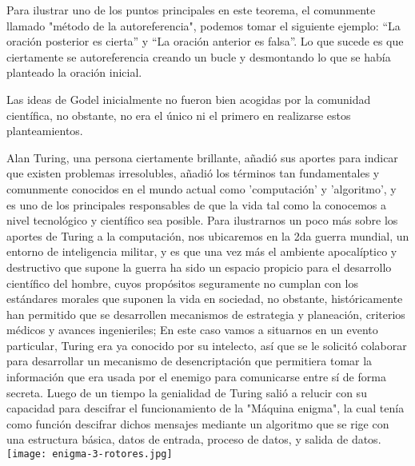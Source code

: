 \documentclass{article}
\begin{document}
Para ilustrar uno de los puntos principales en este teorema, el comunmente llamado "método de la autoreferencia", podemos tomar el siguiente ejemplo: “La oración posterior es cierta” y “La oración anterior es falsa”. Lo que sucede es que ciertamente se autoreferencia creando un bucle y desmontando lo que se había planteado la oración inicial.

Las ideas de Godel inicialmente no fueron bien acogidas por la comunidad científica, no obstante, no era el único ni el primero en realizarse estos planteamientos. 

Alan Turing, una persona ciertamente brillante, añadió sus aportes para indicar que existen problemas irresolubles, añadió los términos tan fundamentales y comunmente conocidos en el mundo actual como 'computación' y 'algoritmo', y es uno de los principales responsables de que la vida tal como la conocemos a nivel tecnológico y científico sea posible.
Para ilustrarnos un poco más sobre los aportes de Turing a la computación, nos ubicaremos en la 2da guerra mundial, un entorno de inteligencia militar, y es que una vez más el ambiente apocalíptico y destructivo que supone la guerra ha sido un espacio propicio para el desarrollo científico del hombre, cuyos propósitos seguramente no cumplan con los estándares morales que suponen la vida en sociedad, no obstante, históricamente han permitido que se desarrollen mecanismos de estrategia y planeación, criterios médicos y avances ingenieriles; En este caso vamos a situarnos en un evento particular, Turing era ya conocido por su intelecto, así que se le solicitó colaborar para desarrollar un mecanismo de desencriptación que permitiera tomar la información que era usada por el enemigo para comunicarse entre sí de forma secreta. Luego de un tiempo la genialidad de Turing salió a relucir con su capacidad para descifrar el funcionamiento de la "Máquina enigma", la cual tenía como función descifrar dichos mensajes mediante un algoritmo que se rige con una estructura básica, datos de entrada, proceso de datos, y salida de datos.
\texttt{[image: enigma-3-rotores.jpg]}
\label{fig:enigma-3-rotores.jpg}
\end{document}
